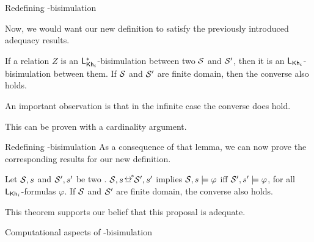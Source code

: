 \documentclass{beamer}
\begin{document}

\begin{frame}{Redefining \KHilogic-bisimulation}

    Now, we would want our new definition to satisfy the previously introduced adequacy results. \pause

    \begin{lemma}
        If a relation $Z$ is an $\mathsf{L}_{\operatorname{\sf Kh}_i}^*$-bisimulation between two \ults 
        $\mathcal{S}$ and $\mathcal{S}'$, then it is an $\mathsf{L}_{\operatorname{\sf Kh}_i}$-bisimulation between them. 
        If $\mathcal{S}$ and $\mathcal{S}'$ are finite domain, then the converse also holds.
    \end{lemma}\pause

    An important observation is that in the infinite case the converse does  hold.

    This can be proven with a cardinality argument.
\end{frame}


\begin{frame}{Redefining \KHilogic-bisimulation}
    As a consequence of that lemma, we can now prove the corresponding results for our new definition. \pause 
    
    \begin{theorem}
    Let $\mathcal{S},s$ and $\mathcal{S}',s'$ be two \ultss. $\model,s\nbisim\model',s'$ implies $\mathcal{S},s\models\varphi$ iff $\mathcal{S}',s'\models\varphi$, for all $\mathsf{L}_{\operatorname{\sf Kh}_i}$-formulas $\varphi$. If $\mathcal{S}$ and $\mathcal{S}'$ are finite domain, the converse also holds.
    \end{theorem}\pause

    This theorem supports our belief that this proposal is adequate. 

\end{frame}



\begin{frame}{Computational aspects of \KHilogic-bisimulation}
    
\end{frame}

\end{document}
